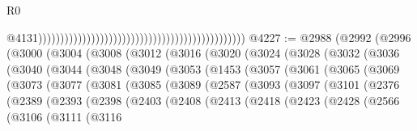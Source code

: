 \begin{lexlean}{R0}
\begin{coremodule}
                                                                                                  @4131)))))))))))))))))))))))))))))))))))))))))))))))
@4227 := @2988
    (@2992
      (@2996
        (@3000
          (@3004
            (@3008
              (@3012
                (@3016
                  (@3020
                    (@3024
                      (@3028
                        (@3032
                          (@3036
                            (@3040
                              (@3044
                                (@3048
                                  (@3049
                                    (@3053
                                      (@1453
                                        (@3057
                                          (@3061
                                            (@3065
                                              (@3069
                                                (@3073
                                                  (@3077
                                                    (@3081
                                                      (@3085
                                                        (@3089
                                                          (@2587
                                                            (@3093
                                                              (@3097
                                                                (@3101
                                                                  (@2376
                                                                    (@2389
                                                                      (@2393
                                                                        (@2398
                                                                          (@2403
                                                                            (@2408
                                                                              (@2413
                                                                                (@2418
                                                                                  (@2423
                                                                                    (@2428
                                                                                      (@2566
                                                                                        (@3106
                                                                                          (@3111
                                                                                            (@3116

\end{coremodule}
\end{lexlean}
